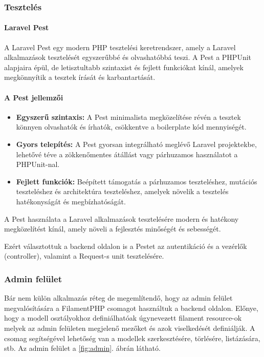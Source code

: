 \subsubsection{Tesztelés}

\paragraph{Laravel Pest}

A Laravel Pest egy modern PHP tesztelési keretrendszer, amely a Laravel alkalmazások tesztelését egyszerűbbé és olvashatóbbá teszi. A Pest a PHPUnit alapjaira épül, de letisztultabb szintaxist és fejlett funkciókat kínál, amelyek megkönnyítik a tesztek írását és karbantartását.

\paragraph{A Pest jellemzői}

\begin{itemize} \item \textbf{Egyszerű szintaxis:} A Pest minimalista megközelítése révén a tesztek könnyen olvashatók és írhatók, csökkentve a boilerplate kód mennyiségét. \item \textbf{Gyors telepítés:} A Pest gyorsan integrálható meglévő Laravel projektekbe, lehetővé téve a zökkenőmentes átállást vagy párhuzamos használatot a PHPUnit-nal. \item \textbf{Fejlett funkciók:} Beépített támogatás a párhuzamos teszteléshez, mutációs teszteléshez és architektúra teszteléshez, amelyek növelik a tesztelés hatékonyságát és megbízhatóságát. \end{itemize}

A Pest használata a Laravel alkalmazások tesztelésére modern és hatékony megközelítést kínál, amely növeli a fejlesztés minőségét és sebességét.

Ezért választottuk a backend oldalon is a Pest\-et az autentikáció és a vezérlők (controller), valamint a Request-s unit tesztelésére.

\subsubsection{Admin felület}

Bár nem külön alkalmazás réteg de megemlítendő, hogy az admin felület megvalósítására a FilamentPHP csomagot \cite{FilamentPHP} használtuk a backend oldalon. Előnye, hogy a modell osztályokhoz definiálhatóak úgynevezett filament resource-ok melyek az admin felületen megjelenő mezőket és azok viselkedését definiálják. A csomag segítségével lehetőség van a modellek szerkesztésére, törlésére, listázására, stb. Az admin felület a \ref{fig:admin}. ábrán látható.

